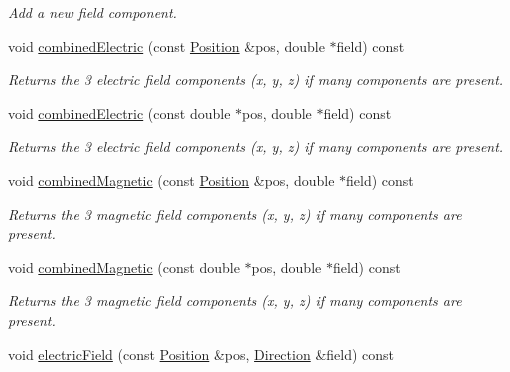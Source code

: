 \begin{DoxyCompactItemize}
\begin{DoxyCompactList}\small\item\em Add a new field component. \end{DoxyCompactList}\item 
void \hyperlink{class_d_d4hep_1_1_geometry_1_1_overlayed_field_a31f6f56be1e9c668517bd65a5ad941f5}{combined\+Electric} (const \hyperlink{namespace_d_d4hep_1_1_geometry_a55083902099d03506c6db01b80404900}{Position} \&pos, double $\ast$field) const
\begin{DoxyCompactList}\small\item\em Returns the 3 electric field components (x, y, z) if many components are present. \end{DoxyCompactList}\item 
void \hyperlink{class_d_d4hep_1_1_geometry_1_1_overlayed_field_a84d77cc61091e78a7bddb5f10af2d97b}{combined\+Electric} (const double $\ast$pos, double $\ast$field) const
\begin{DoxyCompactList}\small\item\em Returns the 3 electric field components (x, y, z) if many components are present. \end{DoxyCompactList}\item 
void \hyperlink{class_d_d4hep_1_1_geometry_1_1_overlayed_field_ab3001a0930c5aa5e996135db201971af}{combined\+Magnetic} (const \hyperlink{namespace_d_d4hep_1_1_geometry_a55083902099d03506c6db01b80404900}{Position} \&pos, double $\ast$field) const
\begin{DoxyCompactList}\small\item\em Returns the 3 magnetic field components (x, y, z) if many components are present. \end{DoxyCompactList}\item 
void \hyperlink{class_d_d4hep_1_1_geometry_1_1_overlayed_field_a803c1f4b73841b6ec1399b5896fb0fb1}{combined\+Magnetic} (const double $\ast$pos, double $\ast$field) const
\begin{DoxyCompactList}\small\item\em Returns the 3 magnetic field components (x, y, z) if many components are present. \end{DoxyCompactList}\item 
void \hyperlink{class_d_d4hep_1_1_geometry_1_1_overlayed_field_a3540b1214a4bfbc9bdc7f1baaafaa811}{electric\+Field} (const \hyperlink{namespace_d_d4hep_1_1_geometry_a55083902099d03506c6db01b80404900}{Position} \&pos, \hyperlink{namespace_d_d4hep_1_1_geometry_a56730a0ddb9f3f089c415cd693bd7c19}{Direction} \&field) const

\end{DoxyCompactItemize}
